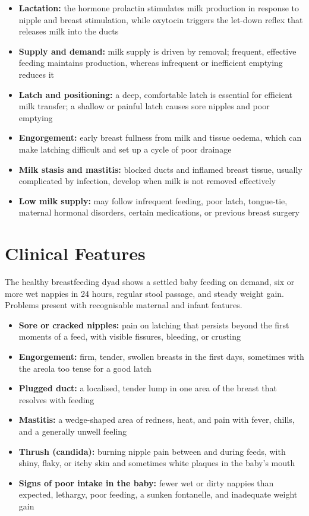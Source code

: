 \begin{itemize}
    \item \textbf{Lactation:} the hormone prolactin stimulates milk production in response to nipple and breast stimulation, while oxytocin triggers the let-down reflex that releases milk into the ducts
    \item \textbf{Supply and demand:} milk supply is driven by removal; frequent, effective feeding maintains production, whereas infrequent or inefficient emptying reduces it
    \item \textbf{Latch and positioning:} a deep, comfortable latch is essential for efficient milk transfer; a shallow or painful latch causes sore nipples and poor emptying
    \item \textbf{Engorgement:} early breast fullness from milk and tissue oedema, which can make latching difficult and set up a cycle of poor drainage
    \item \textbf{Milk stasis and mastitis:} blocked ducts and inflamed breast tissue, usually complicated by infection, develop when milk is not removed effectively
    \item \textbf{Low milk supply:} may follow infrequent feeding, poor latch, tongue-tie, maternal hormonal disorders, certain medications, or previous breast surgery
\end{itemize}

\section*{Clinical Features}
The healthy breastfeeding dyad shows a settled baby feeding on demand, six or more wet nappies in 24 hours, regular stool passage, and steady weight gain. Problems present with recognisable maternal and infant features.

\begin{itemize}
    \item \textbf{Sore or cracked nipples:} pain on latching that persists beyond the first moments of a feed, with visible fissures, bleeding, or crusting
    \item \textbf{Engorgement:} firm, tender, swollen breasts in the first days, sometimes with the areola too tense for a good latch
    \item \textbf{Plugged duct:} a localised, tender lump in one area of the breast that resolves with feeding
    \item \textbf{Mastitis:} a wedge-shaped area of redness, heat, and pain with fever, chills, and a generally unwell feeling
    \item \textbf{Thrush (candida):} burning nipple pain between and during feeds, with shiny, flaky, or itchy skin and sometimes white plaques in the baby's mouth
    \item \textbf{Signs of poor intake in the baby:} fewer wet or dirty nappies than expected, lethargy, poor feeding, a sunken fontanelle, and inadequate weight gain
\end{itemize}

